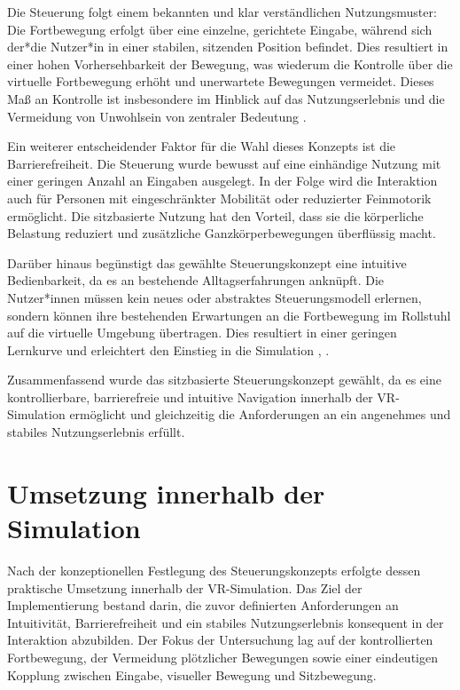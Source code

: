 Die Steuerung folgt einem bekannten und klar verständlichen Nutzungsmuster: Die Fortbewegung erfolgt über eine einzelne, gerichtete Eingabe, während sich der*die Nutzer*in in einer stabilen, sitzenden Position befindet. Dies resultiert in einer hohen Vorhersehbarkeit der Bewegung, was wiederum die Kontrolle über die virtuelle Fortbewegung erhöht und unerwartete Bewegungen vermeidet. Dieses Maß an Kontrolle ist insbesondere im Hinblick auf das Nutzungserlebnis und die Vermeidung von Unwohlsein von zentraler Bedeutung \cite{Jason2015}.

Ein weiterer entscheidender Faktor für die Wahl dieses Konzepts ist die Barrierefreiheit. Die Steuerung wurde bewusst auf eine einhändige Nutzung mit einer geringen Anzahl an Eingaben ausgelegt. In der Folge wird die Interaktion auch für Personen mit eingeschränkter Mobilität oder reduzierter Feinmotorik ermöglicht. Die sitzbasierte Nutzung hat den Vorteil, dass sie die körperliche Belastung reduziert und zusätzliche Ganzkörperbewegungen überflüssig macht.

Darüber hinaus begünstigt das gewählte Steuerungskonzept eine intuitive Bedienbarkeit, da es an bestehende Alltagserfahrungen anknüpft. Die Nutzer*innen müssen kein neues oder abstraktes Steuerungsmodell erlernen, sondern können ihre bestehenden Erwartungen an die Fortbewegung im Rollstuhl auf die virtuelle Umgebung übertragen. Dies resultiert in einer geringen Lernkurve und erleichtert den Einstieg in die Simulation \cite{Jason2015}, \cite{Weibelzahl2025}.

Zusammenfassend wurde das sitzbasierte Steuerungskonzept gewählt, da es eine kontrollierbare, barrierefreie und intuitive Navigation innerhalb der VR-Simulation ermöglicht und gleichzeitig die Anforderungen an ein angenehmes und stabiles Nutzungserlebnis erfüllt.

\section{Umsetzung innerhalb der Simulation}
Nach der konzeptionellen Festlegung des Steuerungskonzepts erfolgte dessen praktische Umsetzung innerhalb der VR-Simulation. Das Ziel der Implementierung bestand darin, die zuvor definierten Anforderungen an Intuitivität, Barrierefreiheit und ein stabiles Nutzungserlebnis konsequent in der Interaktion abzubilden. Der Fokus der Untersuchung lag auf der kontrollierten Fortbewegung, der Vermeidung plötzlicher Bewegungen sowie einer eindeutigen Kopplung zwischen Eingabe, visueller Bewegung und Sitzbewegung.

